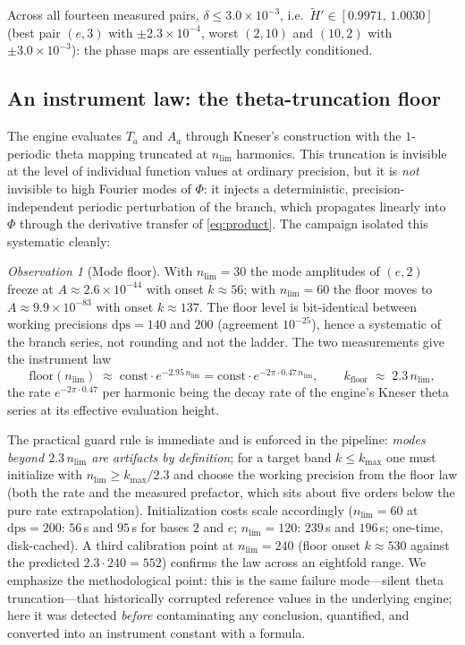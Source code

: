 \documentclass[11pt,a4paper]{article}
\theoremstyle{definition}
\theoremstyle{remark}
\newtheorem{observation}[theorem]{Observation}
\begin{document}
Across all fourteen measured pairs, $\delta\le 3.0\times10^{-3}$, i.e.\
$\widetilde H'\in[0.9971,\,1.0030]$ (best pair $(e,3)$ with $\pm 2.3\times10^{-4}$, worst
$(2,10)$ and $(10,2)$ with $\pm 3.0\times10^{-3}$): the phase maps are essentially perfectly
conditioned.

\subsection{An instrument law: the theta-truncation floor}\label{subsec:floor}

The engine evaluates $T_a$ and $A_a$ through Kneser's construction with the $1$-periodic
theta mapping truncated at $n_{\mathrm{lim}}$ harmonics. This truncation is invisible at the
level of individual function values at ordinary precision, but it is \emph{not} invisible to
high Fourier modes of $\Phi$: it injects a deterministic, precision-independent periodic
perturbation of the branch, which propagates linearly into $\Phi$ through the derivative
transfer of \eqref{eq:product}. The campaign isolated this systematic cleanly:

\begin{observation}[Mode floor]\label{obs:floor}
With $n_{\mathrm{lim}}=30$ the mode amplitudes of $(e,2)$ freeze at
$A\approx 2.6\times10^{-44}$ with onset $k\approx 56$; with $n_{\mathrm{lim}}=60$ the floor
moves to $A\approx 9.9\times10^{-83}$ with onset $k\approx 137$. The floor level is
bit-identical between working precisions $\mathrm{dps}=140$ and $200$ (agreement
$10^{-25}$), hence a systematic of the branch series, not rounding and not the ladder. The
two measurements give the instrument law
\[
\text{floor}(n_{\mathrm{lim}})\;\approx\;\text{const}\cdot e^{-2.95\,n_{\mathrm{lim}}}
=\text{const}\cdot e^{-2\pi\cdot 0.47\,n_{\mathrm{lim}}},
\qquad
k_{\text{floor}}\;\approx\;2.3\,n_{\mathrm{lim}},
\]
the rate $e^{-2\pi\cdot0.47}$ per harmonic being the decay rate of the engine's Kneser theta
series at its effective evaluation height.
\end{observation}

The practical guard rule is immediate and is enforced in the pipeline: \emph{modes beyond
$2.3\,n_{\mathrm{lim}}$ are artifacts by definition}; for a target band $k\le k_{\max}$ one
must initialize with $n_{\mathrm{lim}}\ge k_{\max}/2.3$ and choose the working precision from
the floor law (both the rate and the measured prefactor, which sits about five orders below
the pure rate extrapolation). Initialization costs scale accordingly
($n_{\mathrm{lim}}=60$ at $\mathrm{dps}=200$: $56$\,s and $95$\,s for bases $2$ and $e$;
$n_{\mathrm{lim}}=120$: $239$\,s and $196$\,s; one-time, disk-cached). A third
calibration point at $n_{\mathrm{lim}}=240$ (floor onset $k\approx530$ against the
predicted $2.3\cdot240=552$) confirms the law across an eightfold range. We emphasize the
methodological point: this is the same failure mode---silent theta truncation---that
historically corrupted reference values in the underlying engine; here it was detected
\emph{before} contaminating any conclusion, quantified, and converted into an instrument
constant with a formula.
\end{document}
